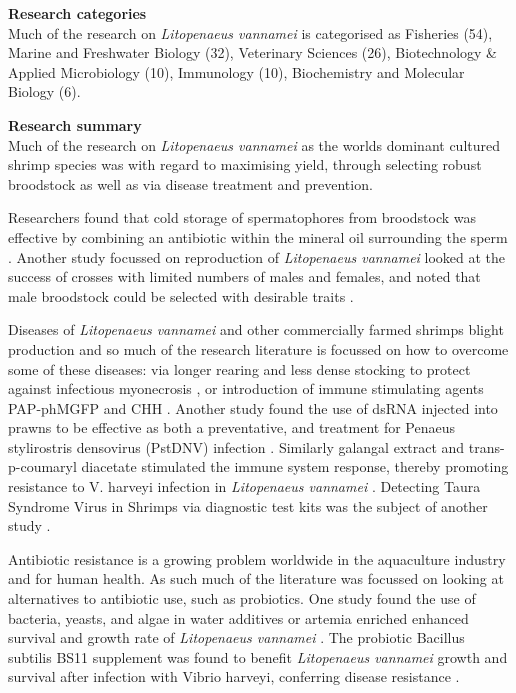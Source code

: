 \documentclass[openany]{book}
\theoremstyle{definition}
\theoremstyle{definition}
\theoremstyle{definition}
\theoremstyle{remark}
\begin{document}
\textbf{Research categories}\\
Much of the research on \emph{Litopenaeus vannamei} is categorised as
Fisheries (54), Marine and Freshwater Biology (32), Veterinary Sciences
(26), Biotechnology \& Applied Microbiology (10), Immunology (10),
Biochemistry and Molecular Biology (6).

\textbf{Research summary}\\
Much of the research on \emph{Litopenaeus vannamei} as the worlds
dominant cultured shrimp species was with regard to maximising yield,
through selecting robust broodstock as well as via disease treatment and
prevention.

Researchers found that cold storage of spermatophores from broodstock
was effective by combining an antibiotic within the mineral oil
surrounding the sperm \citep{Tuantong_2015}. Another study focussed on
reproduction of \emph{Litopenaeus vannamei} looked at the success of
crosses with limited numbers of males and females, and noted that male
broodstock could be selected with desirable traits
\citep{Aungsuchawan_2008}.

Diseases of \emph{Litopenaeus vannamei} and other commercially farmed
shrimps blight production and so much of the research literature is
focussed on how to overcome some of these diseases: via longer rearing
and less dense stocking to protect against infectious myonecrosis
\citet{Silva_2010}, or introduction of immune stimulating agents
PAP-phMGFP and CHH \citep{Silva_2010, Khimmakthong_2011, Wanlem_2011}.
Another study found the use of dsRNA injected into prawns to be
effective as both a preventative, and treatment for Penaeus stylirostris
densovirus (PstDNV) infection \citep{Ho_2011}. Similarly galangal
extract and trans-p-coumaryl diacetate stimulated the immune system
response, thereby promoting resistance to V. harveyi infection in
\emph{Litopenaeus vannamei} \citep{Chaweepack_2014}. Detecting Taura
Syndrome Virus in Shrimps via diagnostic test kits was the subject of
another study \citep{Chaivisuthangkura_2006}.

Antibiotic resistance is a growing problem worldwide in the aquaculture
industry and for human health. As such much of the literature was
focussed on looking at alternatives to antibiotic use, such as
probiotics. One study found the use of bacteria, yeasts, and algae in
water additives or artemia enriched enhanced survival and growth rate of
\emph{Litopenaeus vannamei} \citep{Nimrat_2011}. The probiotic Bacillus
subtilis BS11 supplement was found to benefit \emph{Litopenaeus
vannamei} growth and survival after infection with Vibrio harveyi,
conferring disease resistance \citep{Sapcharoen_2013}.
\end{document}
